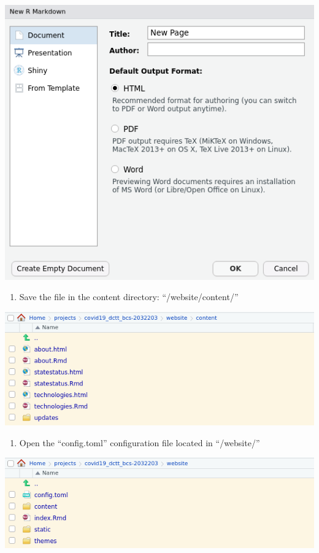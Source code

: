 \documentclass[
]{book}
\providecommand{\tightlist}{%
  \setlength{\itemsep}{0pt}\setlength{\parskip}{0pt}}
\begin{document}
\includegraphics{images/04-newpage_2.png}

\begin{enumerate}
\def\labelenumi{\arabic{enumi}.}
\setcounter{enumi}{2}
\tightlist
\item
  Save the file in the content directory: ``/website/content/''
\end{enumerate}

\includegraphics{images/04-newpage_4.png}

\begin{enumerate}
\def\labelenumi{\arabic{enumi}.}
\setcounter{enumi}{3}
\tightlist
\item
  Open the ``config.toml'' configuration file located in ``/website/''
\end{enumerate}

\includegraphics{images/04-newpage_3.png}
\end{document}
